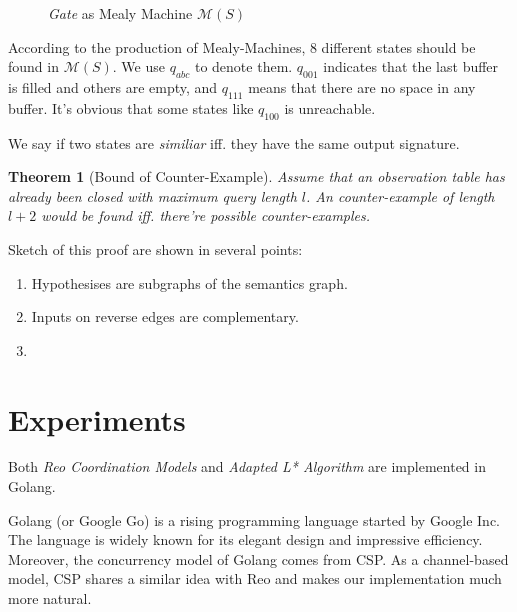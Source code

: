 \documentclass[conference, a4paper]{IEEEtran}
\newtheorem{theorem}{Theorem}
\begin{document}
\begin{figure}[h]
  \begin{center}
    
  \end{center}
  \caption{\emph{Gate} as Mealy Machine $\mathcal{M}(S)$}
  \label{fig:buf3semantics}
\end{figure}

According to the production of Mealy-Machines, 8 different states should be found in
$\mathcal{M}(S)$. We use $q_{abc}$ to denote them. $q_{001}$ indicates that the last buffer is
filled and others are empty, and $q_{111}$ means that there are no space in any buffer. It's
obvious that some states like $q_{100}$ is unreachable.

We say if two states are \emph{similiar} iff. they have the same output signature.

\begin{theorem}[Bound of Counter-Example]
  \label{the:cebound} Assume that an observation table has already been closed with maximum
  query length  $l$. An counter-example of length $l+2$ would be
  found iff. there're possible counter-examples.
\end{theorem}
\begin{IEEEproof}
  Sketch of this proof are shown in several points:
  \begin{enumerate}
    \item Hypothesises are subgraphs of the semantics graph.
    \item Inputs on reverse edges are complementary.
    \item 
  \end{enumerate}
\end{IEEEproof}

\section{Experiments} 
\label{sec:experiment}

Both \emph{Reo Coordination Models} and \emph{Adapted L* Algorithm} are implemented in
Golang\cite{golang}.

Golang (or Google Go) is a rising programming language started by Google Inc. The language is widely
known for its elegant design and impressive efficiency. Moreover, the concurrency model of Golang
comes from CSP\cite{DBLP:books/ph/Hoare85}. As a channel-based model, CSP shares a similar idea with
Reo and makes our implementation much more natural.
\end{document}
